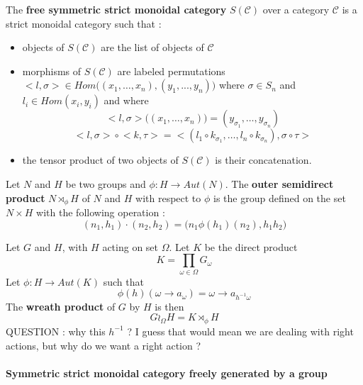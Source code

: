 \documentclass{report}
\begin{document}
\begin{defn}
    The \textbf{free symmetric strict monoidal category} $S(\mathcal{C})$ over a category $\mathcal{C}$ is a strict monoidal category such that :
    \begin{itemize}
        \item objects of $S(\mathcal{C})$ are the list of objects of $\mathcal{C}$
        \item morphisms of  $S(\mathcal{C})$ are labeled permutations $\big<l,\sigma\big> \in Hom\big((x_1,\dots,x_n),(y_1,...,y_n)\big)$ where $\sigma \in S_n$ and $l_i\in Hom(x_i,y_i)$  and where
              $$\big<l,\sigma\big> \big((x_1,\dots, x_n)\big) = (y_{\sigma_1},\dots,y_{\sigma_n})$$
              $$\big<l,\sigma\big>\circ\big<k,\tau\big>  = \big<(l_1 \circ k_{\sigma_1},\dots, l_n \circ k_{\sigma_n}),\sigma\circ\tau\big>$$

        \item the tensor product of two objects of $S(\mathcal{C})$ is their concatenation.
    \end{itemize}
\end{defn}

\begin{defn}
    Let $N$ and $H$ be two groups and $\phi : H \rightarrow Aut(N)$.
    The  \textbf{outer semidirect product} $N\rtimes_\phi H$ of $N$ and $H$ with respect to $\phi$ is the group defined on the set $N\times H$ with the following operation :
    $$(n_1,h_1)\cdot (n_2,h_2) = \big(n_1\phi(h_1)(n_2),h_1h_2\big)$$
\end{defn}

\begin{defn}
    Let $G$ and $H$, with $H$ acting on set $\Omega$. Let $K$ be the direct product
    $$K = \prod_{\omega \in \Omega}G_\omega$$
    Let $\phi : H \rightarrow Aut(K)$ such that
    $$\phi(h)(\omega\rightarrow a_\omega) = \omega \rightarrow a_{h^{-1}\omega}$$
    The \textbf{wreath product} of $G$ by $H$ is then
    $$G\wr_\Omega H = K \rtimes_{\phi}H$$
    QUESTION : why this $h^{-1}$ ? I guess that would mean we are dealing with right actions, but why do we want a right action ?
\end{defn}

\paragraph{Symmetric strict monoidal category freely generated by a group}
\end{document}

